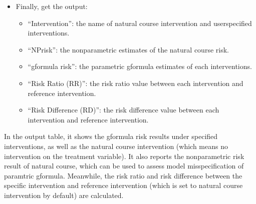 \documentclass[letterpaper,10pt,english]{sphinxmanual}
\begin{document}
\begin{itemize}
\begin{sphinxVerbatim}[commandchars=\\\{\}]
\end{sphinxVerbatim}

\item {} 
\sphinxAtStartPar
Finally, get the output:

\begin{itemize}
\item {} 
\sphinxAtStartPar
“Intervention”: the name of natural course intervention and user\sphinxhyphen{}specified interventions.

\item {} 
\sphinxAtStartPar
“NP\sphinxhyphen{}risk”: the nonparametric estimates of the natural course risk.

\item {} 
\sphinxAtStartPar
“g\sphinxhyphen{}formula risk”: the parametric g\sphinxhyphen{}formula estimates of each interventions.

\item {} 
\sphinxAtStartPar
“Risk Ratio (RR)”: the risk ratio value between each intervention and reference intervention.

\item {} 
\sphinxAtStartPar
“Risk Difference (RD)”: the risk difference value between each intervention and reference intervention.

\end{itemize}

\end{itemize}

\sphinxAtStartPar
In the output table, it shows the g\sphinxhyphen{}formula risk results under specified interventions, as well as the natural course
intervention (which means no intervention on the treatment variable). It also reports the nonparametric risk result of natural course,
which can be used to assess model misspecification of paramtric g\sphinxhyphen{}formula. Meanwhile, the risk ratio and risk difference
between the specific intervention and reference intervention (which is set to natural course intervention by default) are calculated.
\end{document}
